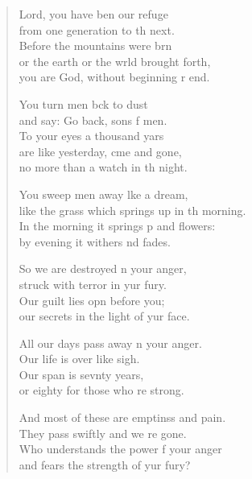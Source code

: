 \settowidth{\versewidth}{like the grass which springs up in the morning.}
\begin{verse}%
  \begin{patverse}
 Lord, you have ben our refuge\Med\\
from one generation to th next.\\
Before the mountains were brn\Flex\\
or the earth or the wrld brought forth,\Med\\
you are God, without beginning r end.

You turn men bck to dust\Med\\
and say: Go back, sons f men.\\
To your eyes a thousand yars\Flex\\
are like yesterday, cme and gone,\Med\\
no more than a watch in th night.

You sweep men away l\pointup{\i}ke a dream,\Med\\
like the grass which springs up in th morning.\\
In the morning it springs p and flowers:\Med\\
by evening it withers nd fades.

So we are destroyed \pointup{\i}n your anger,\Med\\
struck with terror in yur fury.\\
Our guilt lies opn before you;\Med\\
our secrets in the light of yur face.

All our days pass away \pointup{\i}n your anger.\Med\\
Our life is over like  sigh.\\
Our span is sevnty years,\Med\\
or eighty for those who re strong.

And most of these are emptinss and pain.\Med\\
They pass swiftly and we re gone.\\
Who understands the power f your anger\Med\\
and fears the strength of yur fury?


\end{patverse}
\end{verse}
